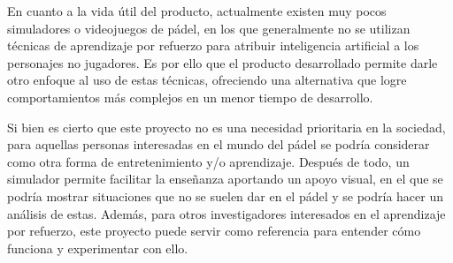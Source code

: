 En cuanto a la vida útil del producto, actualmente existen muy pocos simuladores o videojuegos de pádel, en los que generalmente no se utilizan técnicas de aprendizaje por refuerzo para atribuir inteligencia artificial a los personajes no jugadores. Es por ello que el producto desarrollado permite darle otro enfoque al uso de estas técnicas, ofreciendo una alternativa que logre comportamientos más complejos en un menor tiempo de desarrollo.

Si bien es cierto que este proyecto no es una necesidad prioritaria en la sociedad, para aquellas personas interesadas en el mundo del pádel se podría considerar como otra forma de entretenimiento y/o aprendizaje. Después de todo, un simulador permite facilitar la enseñanza aportando un apoyo visual, en el que se podría mostrar situaciones que no se suelen dar en el pádel y se podría hacer un análisis de estas. Además, para otros investigadores interesados en el aprendizaje por refuerzo, este proyecto puede servir como referencia para entender cómo funciona y experimentar con ello.